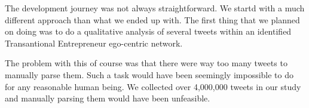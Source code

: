 The development journey was not always straightforward. We startd with a much different approach than what we ended up with. The first thing that we planned on doing was to do a qualitative analysis of several tweets within an identified Transantional Entrepreneur ego-centric network.
\par
The problem with this of course was that there were way too many tweets to manually parse them. Such a task would have been seemingly impossible to do for any reasonable human being. We collected over 4,000,000 tweets in our study and manually parsing them would have been unfeasible.
